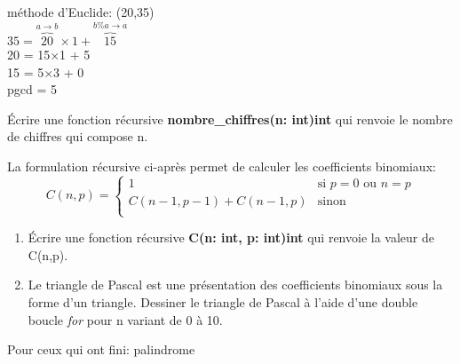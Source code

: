 \documentclass[a4paper,11pt]{article}
\begin{document}
\begin{Form}
\begin{exo}
\begin{commentprof}
méthode d'Euclide: (20,35)\\
$35 = \overbrace{20}^{a\rightarrow b}×1 + \overbrace{15}^{b\%a\rightarrow a}$\\
20 = 15×1 + 5\\
15 = 5×3 + 0\\
pgcd = 5
\end{commentprof}
\end{exo}
\begin{exo}
Écrire une fonction récursive \textbf{nombre\_chiffres(n: int)\;\rightarrow\;int} qui renvoie le nombre de chiffres qui compose n.
\end{exo}
\begin{exo}
La formulation récursive ci-après permet de calculer les coefficients binomiaux:
$$
C(n,p) = \left\{
    \begin{array}{ll}
        1 & \mbox{si } p=0 \mbox{ ou } n=p\\
        C(n-1,p-1)+C(n-1,p) & \mbox{sinon}\\
    \end{array}
\right.
$$
\begin{enumerate}
\item Écrire une fonction récursive \textbf{C(n: int, p: int)\;\rightarrow\;int} qui renvoie la valeur de C(n,p).
\item Le triangle de Pascal est une présentation des coefficients binomiaux sous la forme d'un triangle. Dessiner le triangle de Pascal à l'aide d'une double boucle \emph{for} pour n variant de 0 à 10.
\end{enumerate}
\end{exo}
\begin{commentprof}
Pour ceux qui ont fini: palindrome

\end{commentprof}
\end{Form}
\end{document}
